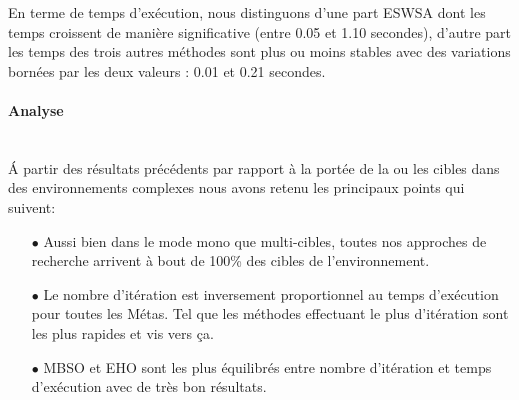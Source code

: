 	En terme de temps d'exécution, nous distinguons d'une part ESWSA dont les temps croissent de manière significative (entre 0.05 et 1.10 secondes), d'autre part les temps des trois autres méthodes sont plus ou moins stables avec des variations bornées par les deux valeurs : 0.01 et 0.21 secondes.
	


\noindent
\hspace{-0.5cm}
\begin{minipage}[t]{0.55\textwidth}
	\captionsetup{width=0.8\linewidth}
	\centering{}
	\label{IP5c}
\end{minipage}\hfill
\begin{minipage}[t]{0.55\textwidth}
	\captionsetup{width=0.8\linewidth}
	\centering{}
	\label{tP5c}
\end{minipage}\hfill



\paragraph{Analyse}
\textbf{ }\\
\'{A} partir des résultats précédents par rapport à la portée de la ou les cibles dans des environnements complexes nous avons  retenu les principaux points qui suivent:
\begin{itemize}
	\item[$\bullet$] Aussi bien dans le mode mono que multi-cibles, toutes nos approches de recherche arrivent à bout de 100\% des cibles de l'environnement.
	\item[$\bullet$] Le nombre d'itération est inversement proportionnel au temps d'exécution pour toutes les Métas. Tel que les méthodes effectuant le plus d'itération sont les plus rapides et vis vers ça.
	\item[$\bullet$] MBSO et EHO sont les plus équilibrés entre nombre d'itération et temps d'exécution avec de très bon résultats. 
\end{itemize}






